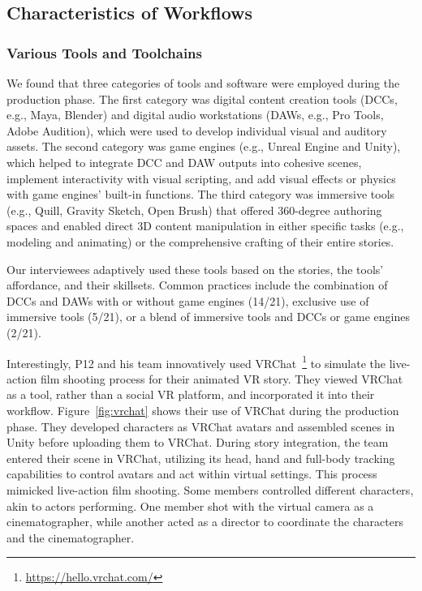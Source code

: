 \subsection{Characteristics of Workflows}

\subsubsection{Various Tools and Toolchains}
\label{sec:process_toolchains}
We found that three categories of tools and software were employed during the production phase. The first category was digital content creation tools (DCCs, e.g., Maya, Blender) and digital audio workstations (DAWs, e.g., Pro Tools, Adobe Audition), which were used to develop individual visual and auditory assets. The second category was game engines (e.g., Unreal Engine and Unity), which helped to integrate DCC and DAW outputs into cohesive scenes, implement interactivity with visual scripting, and add visual effects or physics with game engines' built-in functions. 
The third category was immersive tools (e.g., Quill, Gravity Sketch, Open Brush) that offered 360-degree authoring spaces and enabled direct 3D content manipulation in either specific tasks (e.g., modeling and animating) or the comprehensive crafting of their entire stories. 

Our interviewees adaptively used these tools based on the stories, the tools' affordance, and their skillsets. Common practices include the combination of DCCs and DAWs with or without game engines (14/21), exclusive use of immersive tools (5/21), or a blend of immersive tools and DCCs or game engines (2/21). 

Interestingly, P12 and his team innovatively used VRChat~\footnote{\url{https://hello.vrchat.com/}} to simulate the live-action film shooting process for their animated VR story. They viewed VRChat as a tool, rather than a social VR platform, and incorporated it into their workflow. Figure~\ref{fig:vrchat} shows their use of VRChat during the production phase. They developed characters as VRChat avatars and assembled scenes in Unity before uploading them to VRChat. During story integration, the team entered their scene in VRChat, utilizing its head, hand and full-body tracking capabilities to control avatars and act within virtual settings. 
This process mimicked live-action film shooting. Some members controlled different characters, akin to actors performing. One member shot with the virtual camera as a cinematographer, while another acted as a director to coordinate the characters and the cinematographer.





